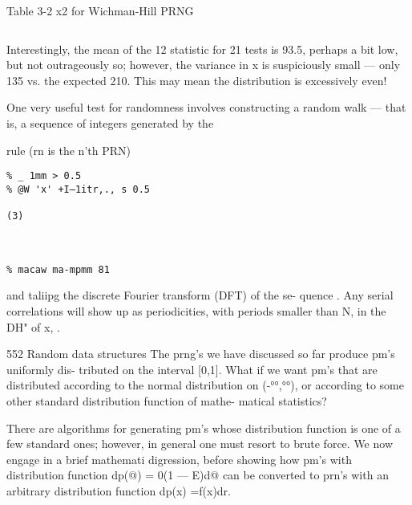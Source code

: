 Table 3-2 x2 for Wichman-Hill PRNG


\begin{verbatim}
\end{verbatim} 
 

Interestingly, the mean of the 12 statistic for 21 tests is 93.5,
perhaps a bit low, but not outrageously so; however, the variance
in x is suspiciously small — only 135 vs. the expected 210. This
may mean the distribution is excessively even!

One very useful test for randomness involves constructing a
random walk — that is, a sequence of integers generated by the

rule (rn is the n'th PRN)
\begin{verbatim}
% _ 1mm > 0.5
% @W 'x' +I—1itr,., s 0.5

(3)

 

% macaw ma-mpmm 81
\end{verbatim}

and taliipg the discrete Fourier transform (DFT) of the se-
quence . Any serial correlations will show up as periodicities,
with periods smaller than N, in the DH" of x, .

552 Random data structures
The prng’s we have discussed so far produce pm’s uniformly dis-
tributed on the interval [0,1]. What if we want pm’s that are
distributed according to the normal distribution on (-°°,°°), or
according to some other standard distribution function of mathe-
matical statistics?

There are algorithms for generating pm’s whose distribution
function is one of a few standard ones; however, in general one
must resort to brute force. We now engage in a brief mathemati
digression, before showing how pm’s with distribution function
dp(@) = 0(1 — E)d@ can be converted to prn’s with an arbitrary
distribution function dp(x) =f(x)dr.

